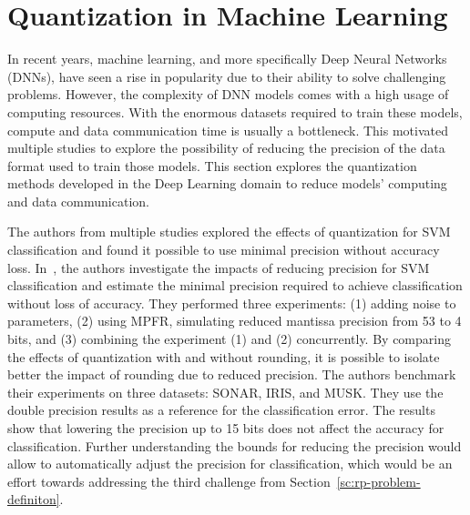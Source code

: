\section{Quantization in Machine Learning}
In recent years, machine learning, and more specifically Deep Neural Networks (DNNs),
have seen a rise in popularity due to their ability to solve challenging problems.
However, the complexity of DNN models comes with a high usage of computing resources.
With the enormous datasets required to train these models, compute and data communication time is usually a bottleneck.
This motivated multiple studies \cite{Johnson2018-up,Wang2018-oo,Lesser2011-mn,Chen2018-an,Judd2015-kw,Vicuna2021-mw}
to explore the possibility of reducing the precision of the data format used to train those models.
This section explores the quantization methods developed in the Deep Learning domain to reduce models' computing and data communication.

The authors from multiple studies explored the effects of quantization for SVM classification
and found it possible to use minimal precision without accuracy loss.
In~\cite{Lesser2011-mn}, the authors investigate the impacts of reducing precision for SVM
classification and estimate the minimal precision required to achieve classification
without loss of accuracy. They performed three experiments:
(1) adding noise to parameters,
(2) using MPFR, simulating reduced mantissa precision from 53 to 4 bits,
and (3) combining the experiment (1) and (2) concurrently.
By comparing the effects of quantization with and without rounding, it is possible to isolate better
the impact of rounding due to reduced precision.
The authors benchmark their experiments on three datasets: SONAR, IRIS, and MUSK.
They use the double precision results as a reference for the classification error.
The results show that lowering the precision up to 15 bits does not affect the accuracy
for classification.
Further understanding the bounds for reducing the precision would allow to automatically
adjust the precision for classification, which would be an effort towards addressing the third
challenge from Section~\ref{sc:rp-problem-definiton}.

